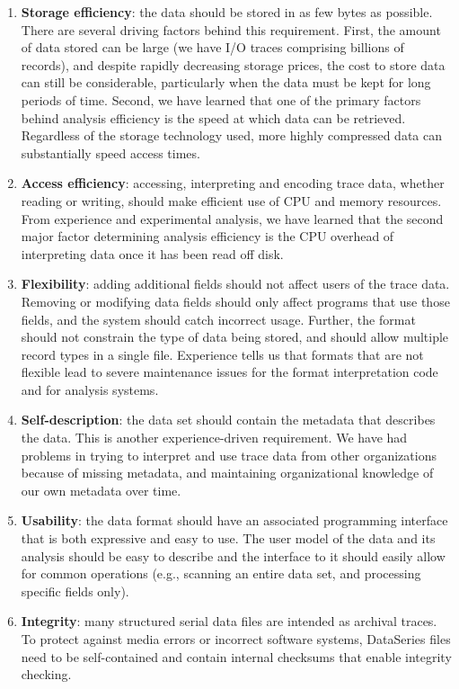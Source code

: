 \documentclass{acm_proc_article-sp}
\begin{document}
\begin{enumerate}

\item \textbf{Storage efficiency}: the data should be stored in as few
bytes as possible. There are several driving factors behind this
requirement. 
First, the amount of data stored can be large (we have
I/O traces comprising billions of records), and despite rapidly
decreasing storage prices, the cost to store data can still be
considerable, particularly when the data must be kept for long periods
of time. 
Second, we have learned that one of the primary factors
behind analysis efficiency is the speed at which data can be
retrieved. Regardless of the storage technology used, more highly
compressed data can substantially speed access times.

\item \textbf{Access efficiency}: accessing, interpreting and encoding
trace data, whether reading or writing, should make efficient use of
CPU and memory resources. From experience and experimental analysis,
we have learned that the second major factor determining analysis
efficiency is the CPU overhead of interpreting data once it has been
read off disk.

\item \textbf{Flexibility}: adding additional fields should not affect
users of the trace data.  Removing or modifying data fields should
only affect programs that use those fields, and the system should
catch incorrect usage.  Further, the format should not constrain
the type of data being stored, and should allow multiple record types
in a single file. 
Experience 
tells us that formats that
are not flexible lead to severe maintenance issues for 
the format
interpretation code and for analysis systems.

\item \textbf{Self-description}: the data set should contain the
metadata that describes the data. This is another experience-driven
requirement. We have had problems in trying to interpret and use trace
data from other organizations because of missing metadata, and
maintaining organizational knowledge of our own metadata over time.

\item \textbf{Usability}: the data format should have an
associated programming interface that is both expressive and easy to
use. 
The user model of the data and its analysis should
be easy to describe and the interface to it should easily allow for
common operations (e.g., scanning an entire data set, and processing
specific fields only).

\item \textbf{Integrity}: many structured serial data files are 
intended as archival traces. To protect against media
errors or incorrect software systems, DataSeries files need to be
self-contained and contain internal checksums that enable
integrity checking.

\end{enumerate}
\end{document}
